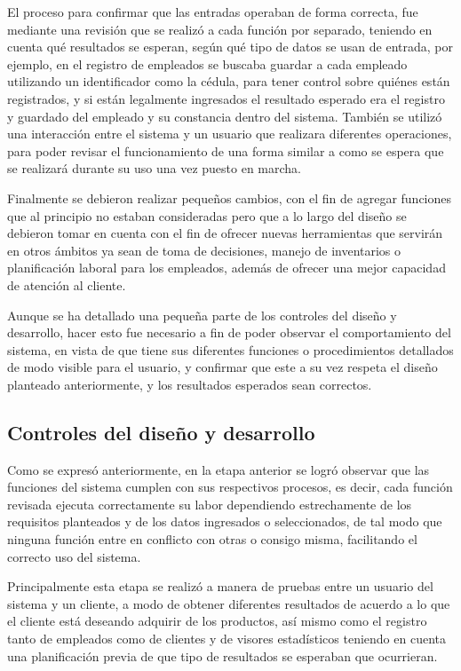 \documentclass[12pt]{article}
\begin{document}
El proceso para confirmar que las entradas operaban de forma correcta, fue mediante una revisión que se realizó a cada función por separado, teniendo en cuenta qué resultados se esperan, según qué tipo de datos se usan de entrada, por ejemplo, en el registro de empleados se buscaba guardar a cada empleado utilizando un identificador como la cédula, para tener control sobre quiénes están registrados, y si están legalmente ingresados el resultado esperado era el registro y guardado del empleado y su constancia dentro del sistema. También se utilizó una interacción entre el sistema y un usuario que realizara diferentes operaciones, para poder revisar el funcionamiento de una forma similar a como se espera que se realizará durante su uso una vez puesto en marcha.

Finalmente se debieron realizar pequeños cambios, con el fin de agregar funciones que al principio no estaban consideradas pero que a lo largo del diseño se debieron tomar en cuenta con el fin de ofrecer nuevas herramientas que servirán en otros ámbitos ya sean de toma de decisiones, manejo de inventarios o planificación laboral para los empleados, además de ofrecer una mejor capacidad de atención al cliente.

Aunque se ha detallado una pequeña parte de los controles del diseño y desarrollo, hacer esto fue necesario a fin de poder observar el comportamiento del sistema, en vista de que tiene sus diferentes funciones o procedimientos detallados de modo visible para el usuario, y confirmar que este a su vez respeta el diseño planteado anteriormente, y los resultados esperados sean correctos.

\subsection{Controles del diseño y desarrollo}
Como se expresó anteriormente, en la etapa anterior se logró observar que las funciones del sistema cumplen con sus respectivos procesos, es decir, cada función revisada ejecuta correctamente su labor dependiendo estrechamente de los requisitos planteados y de los datos ingresados o seleccionados, de tal modo que ninguna función entre en conflicto con otras o consigo misma, facilitando el correcto uso del sistema.

Principalmente esta etapa se realizó a manera de pruebas entre un usuario del sistema y un cliente, a modo de obtener diferentes resultados de acuerdo a lo que el cliente está deseando adquirir de los productos, así mismo como el registro tanto de empleados como de clientes y de visores estadísticos teniendo en cuenta una planificación previa de que tipo de resultados se esperaban que ocurrieran.
\end{document}
